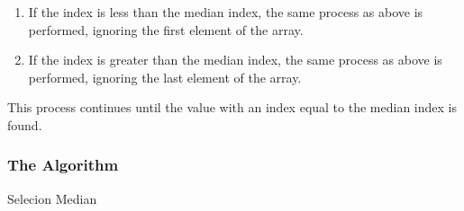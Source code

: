 \documentclass{article}
\begin{document}
        \begin{enumerate}
            \item If the index is less than the median index, the same process as above is performed, ignoring the first element of the array.
            \item If the index is greater than the median index, the same process as above is performed, ignoring the last element of the array.

        \end{enumerate}

        This process continues until the value with an index equal to the median index is found.

        \subsubsection{The Algorithm}
            \begin{algorithm}[H]
                \caption{Selecion Median}
                \begin{algorithmic}[1]
                    \Function{Median}{$A[0..n - 1$}
                        \Else
                        \EndIf
                    \EndFunction\\

                        \EndIf
                        \EndIf
                        \EndIf
                    \EndFunction\\


                            \EndIf
                        \EndFor
                    \EndFunction
                \end{algorithmic}
            \end{algorithm}
\end{document}
